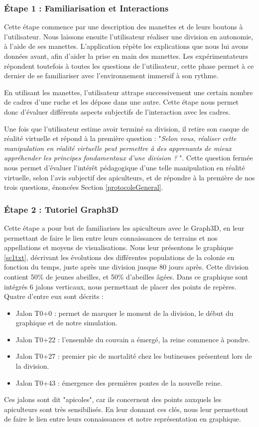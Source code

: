 		\subsubsection{Étape 1 : Familiarisation et Interactions}
		Cette étape commence par une description des manettes et de leurs boutons à l'utilisateur. Nous laissons ensuite l'utilisateur réaliser une division en autonomie, à l'aide de ses manettes. L'application répète les explications que nous lui avons données avant, afin d'aider la prise en main des manettes. Les expérimentateurs répondent toutefois à toutes les questions de l'utilisateur, cette phase permet à ce dernier de se familiariser avec l'environnement immersif à son rythme.
		
		En utilisant les manettes, l'utilisateur attrape successivement une certain nombre de cadres d'une ruche et les dépose dans une autre. Cette étape nous permet donc d'évaluer différents aspects subjectifs de l'interaction avec les cadres.
		
		Une fois que l'utilisateur estime avoir terminé sa division, il retire son casque de réalité virtuelle et répond à la première question : "\textit{Selon vous, réaliser cette manipulation en réalité virtuelle peut permettre à des apprenants de mieux appréhender les principes fondamentaux d'une division ? }". Cette question fermée nous permet d'évaluer l'intérêt pédagogique d'une telle manipulation en réalité virtuelle, selon l'avis subjectif des apiculteurs, et de répondre à la première de nos trois questions, énoncées Section \ref{protocoleGeneral}.
		
		\subsubsection{Étape 2 : Tutoriel Graph3D}
		Cette étape a pour but de familiarises les apiculteurs avec le Graph3D, en leur permettant de faire le lien entre leurs connaissances de terrains et nos appellations et moyens de visualisations. Nous leur présentons le graphique \ref{sc1txt}, décrivant les évolutions des différentes populations de la colonie en fonction du temps, juste après une division jusque 80 jours après. Cette division contient 50\% de jeunes abeilles, et 50\% d'abeilles âgées. Dans ce graphique sont intégrés 6 jalons verticaux, nous permettant de placer des points de repères. Quatre d'entre eux sont décrits :
		\begin{itemize}
			\item Jalon T0+0 : permet de marquer le moment de la division, le début du graphique et de notre simulation.
			\item Jalon T0+22 : l'ensemble du couvain a émergé, la reine commence à pondre.
			\item Jalon T0+27 : premier pic de mortalité chez les butineuses présentent lors de la division.
			\item Jalon T0+43 : émergence des premières pontes de la nouvelle reine.
		\end{itemize}
		Ces jalons sont dit "apicoles", car ils concernent des points auxquels les apiculteurs sont très sensibilisés. En leur donnant ces clés, nous leur permettont de faire le lien entre leurs connaissances et notre représentation en graphique.
		
